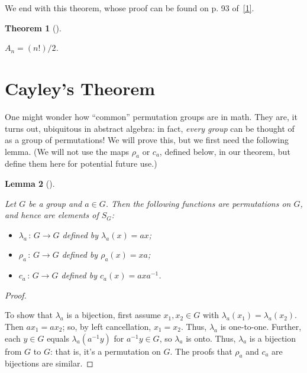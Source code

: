 \documentclass[10pt,]{book}
\theoremstyle{plain}
\newtheorem{theorem}{Theorem}[section]
\newtheorem{lemma}[theorem]{Lemma}
\theoremstyle{definition}
\theoremstyle{definition}
\theoremstyle{definition}
\theoremstyle{definition}
\numberwithin{equation}{section}
\begin{document}
    We end with this theorem, whose proof can be found on p. 93 of~\hyperlink{F}{[1]}.
\begin{theorem}[{}]\label{theorem-35}

        \(A_n=(n!)/2\).
\end{theorem}
\typeout{************************************************}
\typeout{************************************************}
\section[{Cayley's Theorem}]{Cayley's Theorem}\label{section-20}

    One might wonder how ``common'' permutation groups are in math. They
    are, it turns out, ubiquitous in abstract algebra: in fact, \emph{every group} can be thought of as a group of permutations! We will
    prove this, but we first need the following lemma. (We will not use
    the maps \(\rho_a\) or \(c_a\), defined below, in our theorem, but
    define them here for potential future use.)
\begin{lemma}[{}]\label{cay_lem}

        Let \(G\) be a group and \(a\in G\). Then the
        following functions are permutations on \(G\), and hence are elements
        of \(S_G\):


        \leavevmode%
\begin{itemize}[label=\textbullet]
\item{}
              \(\lambda_a\,:\,G\to G\) defined by \(\lambda_a(x)=ax\);
\item{}
              \(\rho_a\,:\,G\to G\) defined by \(\rho_a(x)=xa\);
\item{}
              \(c_a\,:\,G\to G\) defined by \(c_a(x)=axa^{-1}\).
\end{itemize}

\end{lemma}
\begin{proof}\hypertarget{proof-29}{}

      To show that \(\lambda_a\) is a bijection, first assume \(x_1,x_2 \in G\) with
      \(\lambda_a(x_1)=\lambda_a(x_2)\). Then \(ax_1=ax_2\); so, by left
      cancellation, \(x_1=x_2\). Thus, \(\lambda_a\) is one-to-one. Further,
      each \(y\in G\) equals \(\lambda_a(a^{-1}y)\) for \(a^{-1}y\in G\), so
      \(\lambda_a\) is onto. Thus, \(\lambda_a\) is a bijection from \(G\) to
      \(G\): that is, it's a permutation on \(G\). The proofs that \(\rho_a\) and
      \(c_a\) are bijections are similar.
\end{proof}
\end{document}
